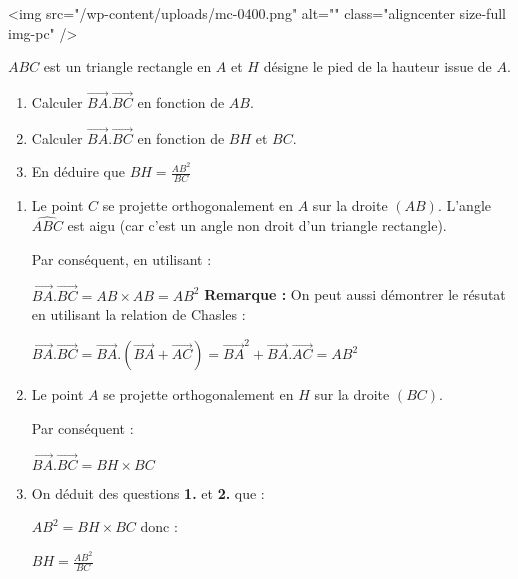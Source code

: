 
%
<img src="/wp-content/uploads/mc-0400.png" alt="" class="aligncenter size-full  img-pc" />

\begin{center}
\end{center}
$ABC$ est un triangle rectangle en $A$ et $H$ désigne le pied de la hauteur issue de $A$.
\begin{enumerate}
     \item
     Calculer $\overrightarrow{BA}.\overrightarrow{BC}$ en fonction de $AB$.
     \item
     Calculer $\overrightarrow{BA}.\overrightarrow{BC}$ en fonction de $BH$ et $BC$.
     \item
     En déduire que $BH=\frac{AB^{2}}{BC}$
\end{enumerate}
\begin{corrige}
     \begin{enumerate}
          \item
          Le point $C$ se projette orthogonalement en $A$ sur la droite $\left(AB\right)$. L'angle $\widehat{ABC}$ est aigu (car c'est un angle non droit d'un triangle rectangle).
          \par
          Par conséquent, en utilisant  :
          \par
          $\overrightarrow{BA}.\overrightarrow{BC}=AB\times AB=AB^{2}$
\medskip
          \textbf{Remarque :} On peut aussi démontrer le résutat en utilisant la relation de Chasles :
          \par
          $\overrightarrow{BA}.\overrightarrow{BC}=\overrightarrow{BA}.\left(\overrightarrow{BA}+\overrightarrow{AC}\right)=\overrightarrow{BA}^{2}+\overrightarrow{BA}.\overrightarrow{AC}=AB^{2}$
          \item
          Le point $A$ se projette orthogonalement en $H$ sur la droite $\left(BC\right)$.
          \par
          Par conséquent :
          \par
          $\overrightarrow{BA}.\overrightarrow{BC}=BH\times BC$
          \item
          On déduit des questions \textbf{1.} et \textbf{2.} que :
          \par
          $AB^{2}=BH\times BC$ donc :
          \par
          $BH=\frac{AB^{2}}{BC}$
     \end{enumerate}
\end{corrige}
